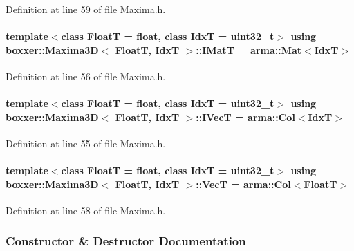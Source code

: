 Definition at line 59 of file Maxima.\+h.

\paragraph[{\texorpdfstring{I\+MatT}{IMatT}}]{\setlength{\rightskip}{0pt plus 5cm}template$<$class FloatT  = float, class IdxT  = uint32\+\_\+t$>$ using {\bf boxxer\+::\+Maxima3D}$<$ FloatT, IdxT $>$\+::{\bf I\+MatT} =  arma\+::\+Mat$<$IdxT$>$}\hypertarget{classboxxer_1_1Maxima3D_a51dcfe38a24fa1264aabbc4369d795bb}{}\label{classboxxer_1_1Maxima3D_a51dcfe38a24fa1264aabbc4369d795bb}


Definition at line 56 of file Maxima.\+h.

\paragraph[{\texorpdfstring{I\+VecT}{IVecT}}]{\setlength{\rightskip}{0pt plus 5cm}template$<$class FloatT  = float, class IdxT  = uint32\+\_\+t$>$ using {\bf boxxer\+::\+Maxima3D}$<$ FloatT, IdxT $>$\+::{\bf I\+VecT} =  arma\+::\+Col$<$IdxT$>$}\hypertarget{classboxxer_1_1Maxima3D_a5fee3acd26edc152ba90e90812e40c1f}{}\label{classboxxer_1_1Maxima3D_a5fee3acd26edc152ba90e90812e40c1f}


Definition at line 55 of file Maxima.\+h.

\paragraph[{\texorpdfstring{VecT}{VecT}}]{\setlength{\rightskip}{0pt plus 5cm}template$<$class FloatT  = float, class IdxT  = uint32\+\_\+t$>$ using {\bf boxxer\+::\+Maxima3D}$<$ FloatT, IdxT $>$\+::{\bf VecT} =  arma\+::\+Col$<$FloatT$>$}\hypertarget{classboxxer_1_1Maxima3D_a3b589b4792d6446b7418a565314b126b}{}\label{classboxxer_1_1Maxima3D_a3b589b4792d6446b7418a565314b126b}


Definition at line 58 of file Maxima.\+h.



\subsubsection{Constructor \& Destructor Documentation}
